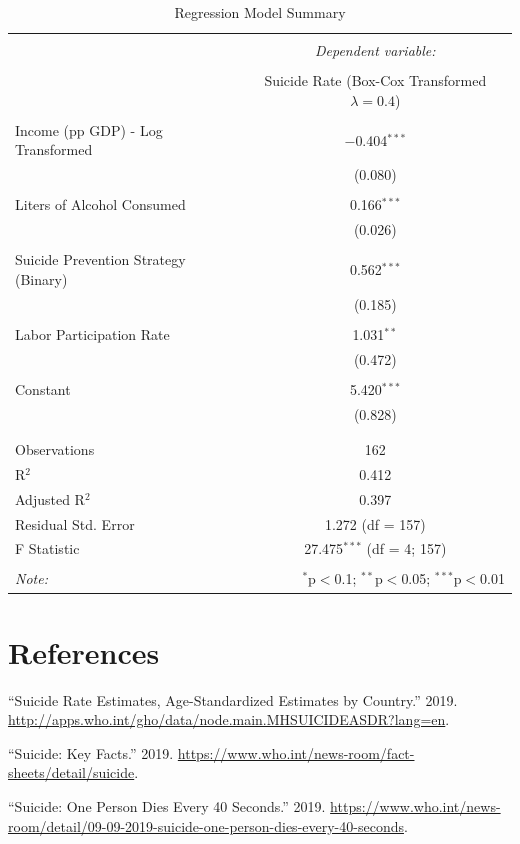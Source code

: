 \documentclass[]{article}
\begin{document}
\begin{table}[H] \centering 
  \caption {Regression Model Summary} 
  \label{tab:title} 
\begin{tabular}{@{\extracolsep{5pt}}lc} 
\\[-1.8ex]\hline 
\hline \\[-1.8ex] 
 & \multicolumn{1}{c}{\textit{Dependent variable:}} \\ 
\cline{2-2} 
\\[-1.8ex] & Suicide Rate (Box-Cox Transformed $\lambda = 0.4$) \\ 
\hline \\[-1.8ex] 
 Income (pp GDP) - Log Transformed & $-$0.404$^{***}$ \\ 
  & (0.080) \\ 
  & \\ 
Liters of Alcohol Consumed & 0.166$^{***}$ \\ 
  & (0.026) \\ 
  & \\ 
Suicide Prevention Strategy (Binary) & 0.562$^{***}$ \\ 
  & (0.185) \\ 
  & \\ 
Labor Participation Rate & 1.031$^{**}$ \\ 
  & (0.472) \\ 
  & \\ 
 Constant & 5.420$^{***}$ \\ 
  & (0.828) \\ 
  & \\ 
\hline \\[-1.8ex] 
Observations & 162 \\ 
R$^{2}$ & 0.412 \\ 
Adjusted R$^{2}$ & 0.397 \\ 
Residual Std. Error & 1.272 (df = 157) \\ 
F Statistic & 27.475$^{***}$ (df = 4; 157) \\ 
\hline 
\hline \\[-1.8ex] 
\textit{Note:}  & \multicolumn{1}{r}{$^{*}$p$<$0.1; $^{**}$p$<$0.05; $^{***}$p$<$0.01} \\ 
\end{tabular} 
\end{table}

\newpage

\section*{References}\label{references}

\hypertarget{refs}{}
\hypertarget{ref-whodat2019}{}
``Suicide Rate Estimates, Age-Standardized Estimates by Country.'' 2019.
\url{http://apps.who.int/gho/data/node.main.MHSUICIDEASDR?lang=en}.

\hypertarget{ref-stats2019}{}
``Suicide: Key Facts.'' 2019.
\url{https://www.who.int/news-room/fact-sheets/detail/suicide}.

\hypertarget{ref-who2019}{}
``Suicide: One Person Dies Every 40 Seconds.'' 2019.
\url{https://www.who.int/news-room/detail/09-09-2019-suicide-one-person-dies-every-40-seconds}.
\end{document}

